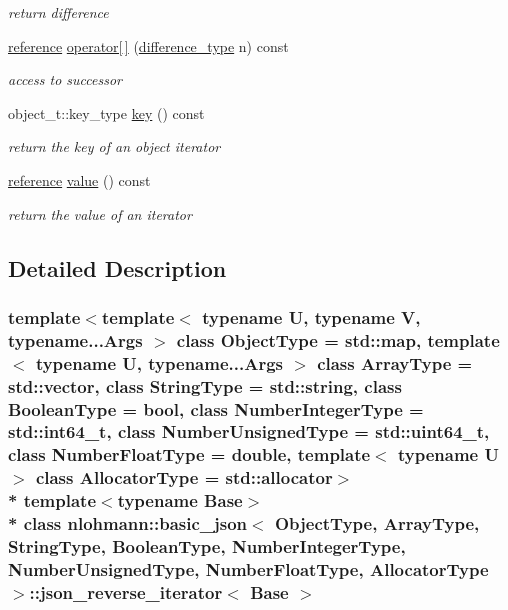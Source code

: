 \begin{DoxyCompactItemize}
\begin{DoxyCompactList}\small\item\em return difference \end{DoxyCompactList}\item 
\hyperlink{classnlohmann_1_1basic__json_1_1json__reverse__iterator_a7265535f39299824f9712a2ca15013c3}{reference} \hyperlink{classnlohmann_1_1basic__json_1_1json__reverse__iterator_ad4ec2bbb8347e7aa3b58e616fd6c7f40}{operator\mbox{[}$\,$\mbox{]}} (\hyperlink{classnlohmann_1_1basic__json_aec316934a555dd1acdd3600e5d4a4cdf}{difference\+\_\+type} n) const 
\begin{DoxyCompactList}\small\item\em access to successor \end{DoxyCompactList}\item 
object\+\_\+t\+::key\+\_\+type \hyperlink{classnlohmann_1_1basic__json_1_1json__reverse__iterator_acecae6d237fcf14c909fb42b9d2e2955}{key} () const 
\begin{DoxyCompactList}\small\item\em return the key of an object iterator \end{DoxyCompactList}\item 
\hyperlink{classnlohmann_1_1basic__json_1_1json__reverse__iterator_a7265535f39299824f9712a2ca15013c3}{reference} \hyperlink{classnlohmann_1_1basic__json_1_1json__reverse__iterator_aca5116682e206dac48f8a56716a3280b}{value} () const 
\begin{DoxyCompactList}\small\item\em return the value of an iterator \end{DoxyCompactList}\end{DoxyCompactItemize}


\subsection{Detailed Description}
\subsubsection*{template$<$template$<$ typename U, typename V, typename...\+Args $>$ class Object\+Type = std\+::map, template$<$ typename U, typename...\+Args $>$ class Array\+Type = std\+::vector, class String\+Type = std\+::string, class Boolean\+Type = bool, class Number\+Integer\+Type = std\+::int64\+\_\+t, class Number\+Unsigned\+Type = std\+::uint64\+\_\+t, class Number\+Float\+Type = double, template$<$ typename U $>$ class Allocator\+Type = std\+::allocator$>$\\*
template$<$typename Base$>$\\*
class nlohmann\+::basic\+\_\+json$<$ Object\+Type, Array\+Type, String\+Type, Boolean\+Type, Number\+Integer\+Type, Number\+Unsigned\+Type, Number\+Float\+Type, Allocator\+Type $>$\+::json\+\_\+reverse\+\_\+iterator$<$ Base $>$}


